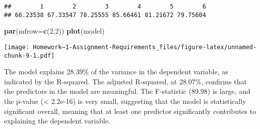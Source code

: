\documentclass[
]{article}
\newenvironment{Shaded}{\begin{snugshade}}{\end{snugshade}}
\newcommand{\AttributeTok}[1]{\textcolor[rgb]{0.13,0.29,0.53}{#1}}
\newcommand{\DecValTok}[1]{\textcolor[rgb]{0.00,0.00,0.81}{#1}}
\newcommand{\FunctionTok}[1]{\textcolor[rgb]{0.13,0.29,0.53}{\textbf{#1}}}
\newcommand{\NormalTok}[1]{#1}
\begin{document}
\begin{verbatim}
##        1        2        3        4        5        6 
## 66.23538 67.33547 78.25555 85.66461 81.21672 79.75604
\end{verbatim}

\begin{Shaded}
\begin{Highlighting}[]
\FunctionTok{par}\NormalTok{(}\AttributeTok{mfrow=}\FunctionTok{c}\NormalTok{(}\DecValTok{2}\NormalTok{,}\DecValTok{2}\NormalTok{)) }
\FunctionTok{plot}\NormalTok{(model)}
\end{Highlighting}
\end{Shaded}

\texttt{[image: Homework--1-Assignment-Requirements\_files/figure-latex/unnamed-chunk-9-1.pdf]}

The model explains 28.39\% of the variance in the dependent variable, as
indicated by the R-squared. The adjusted R-squared, at 28.07\%, confirms
that the predictors in the model are meaningful. The F-statistic (89.98)
is large, and the p-value (\textless{} 2.2e-16) is very small,
suggesting that the model is statistically significant overall, meaning
that at least one predictor significantly contributes to explaining the
dependent variable.
\end{document}
